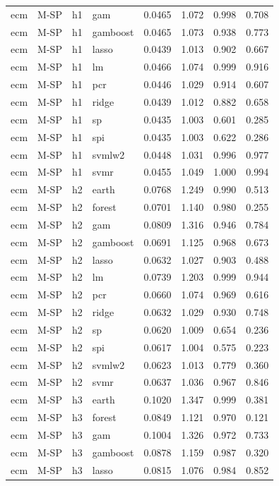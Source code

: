 \begin{ThreePartTable}
\begin{longtable}[t]{llclcccc}
ecm & M-SP & h1 & gam & 0.0465 & 1.072 & 0.998 & 0.708\\
ecm & M-SP & h1 & gamboost & 0.0465 & 1.073 & 0.938 & 0.773\\
ecm & M-SP & h1 & lasso & 0.0439 & 1.013 & 0.902 & 0.667\\
ecm & M-SP & h1 & lm & 0.0466 & 1.074 & 0.999 & 0.916\\
ecm & M-SP & h1 & pcr & 0.0446 & 1.029 & 0.914 & 0.607\\
ecm & M-SP & h1 & ridge & 0.0439 & 1.012 & 0.882 & 0.658\\
ecm & M-SP & h1 & sp & 0.0435 & 1.003 & 0.601 & 0.285\\
ecm & M-SP & h1 & spi & 0.0435 & 1.003 & 0.622 & 0.286\\
ecm & M-SP & h1 & svmlw2 & 0.0448 & 1.031 & 0.996 & 0.977\\
ecm & M-SP & h1 & svmr & 0.0455 & 1.049 & 1.000 & 0.994\\
\addlinespace
ecm & M-SP & h2 & earth & 0.0768 & 1.249 & 0.990 & 0.513\\
ecm & M-SP & h2 & forest & 0.0701 & 1.140 & 0.980 & 0.255\\
ecm & M-SP & h2 & gam & 0.0809 & 1.316 & 0.946 & 0.784\\
ecm & M-SP & h2 & gamboost & 0.0691 & 1.125 & 0.968 & 0.673\\
ecm & M-SP & h2 & lasso & 0.0632 & 1.027 & 0.903 & 0.488\\
ecm & M-SP & h2 & lm & 0.0739 & 1.203 & 0.999 & 0.944\\
ecm & M-SP & h2 & pcr & 0.0660 & 1.074 & 0.969 & 0.616\\
ecm & M-SP & h2 & ridge & 0.0632 & 1.029 & 0.930 & 0.748\\
ecm & M-SP & h2 & sp & 0.0620 & 1.009 & 0.654 & 0.236\\
ecm & M-SP & h2 & spi & 0.0617 & 1.004 & 0.575 & 0.223\\
ecm & M-SP & h2 & svmlw2 & 0.0623 & 1.013 & 0.779 & 0.360\\
ecm & M-SP & h2 & svmr & 0.0637 & 1.036 & 0.967 & 0.846\\
\addlinespace
ecm & M-SP & h3 & earth & 0.1020 & 1.347 & 0.999 & 0.381\\
ecm & M-SP & h3 & forest & 0.0849 & 1.121 & 0.970 & 0.121\\
ecm & M-SP & h3 & gam & 0.1004 & 1.326 & 0.972 & 0.733\\
ecm & M-SP & h3 & gamboost & 0.0878 & 1.159 & 0.987 & 0.320\\
ecm & M-SP & h3 & lasso & 0.0815 & 1.076 & 0.984 & 0.852\\

\end{longtable}
\end{ThreePartTable}
